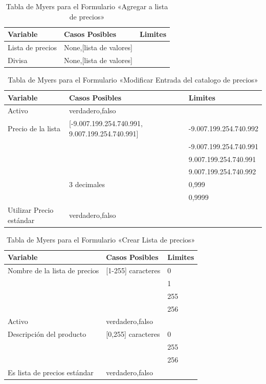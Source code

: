 \begin{table}
\centering
\begin{tabular}{|l|p{5.0cm}|l|}
\hline
\textbf{Variable} & \textbf{Casos Posibles} & \textbf{Limites} \\
\hline
Lista de precios & None,[lista de valores] & \\
\hline
Divisa & None,[lista de valores] & \\
\hline
\end{tabular}
\caption{Tabla de Myers para el Formulario «Agregar a lista de precios»}
\label{myers_03}
\end{table}

\begin{table}
\centering
\begin{tabular}{|l|p{5.0cm}|l|}
\hline
\textbf{Variable} & \textbf{Casos Posibles} & \textbf{Limites} \\
\hline
Activo  & {verdadero,falso} & \\
\hline
Precio de la lista & [-9.007.199.254.740.991, 9.007.199.254.740.991] & -9.007.199.254.740.992 \\
& & -9.007.199.254.740.991 \\
& & 9.007.199.254.740.991 \\
& & 9.007.199.254.740.992 \\
& 3 decimales & 0,999 \\
& & 0,9999 \\
\hline
Utilizar Precio estándar & {verdadero,falso} & \\
\hline
\end{tabular}
\caption{Tabla de Myers para el Formulario «Modificar Entrada del catalogo de precios»}
\label{myers_04}
\end{table}

\begin{table}
\centering
\begin{tabular}{|l|l|l|}
\hline
\textbf{Variable} & \textbf{Casos Posibles} & \textbf{Limites} \\
\hline
Nombre de la lista de precios & [1-255] caracteres & 0 \\
& & 1 \\
& & 255 \\
& & 256 \\
\hline
Activo  & {verdadero,falso} & \\
\hline
Descripción del producto & [0,255] caracteres & 0 \\
& & 255 \\
& & 256 \\
\hline
Es lista de precios estándar & {verdadero,falso} & \\
\hline
\end{tabular}
\caption{Tabla de Myers para el Formulario «Crear Lista de precios»}
\label{myers_05}
\end{table}


